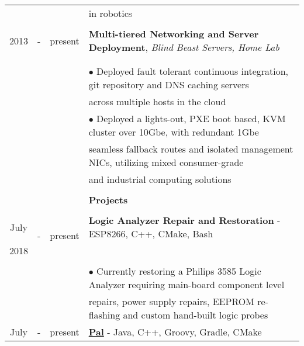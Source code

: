 \documentclass[10pt]{article}
\begin{document}
\begin{table}[ht]
\begin{tabular}{@{\hspace{0mm}}c@{\hspace{1mm}}c@{\hspace{3mm}}cl}
            & & & \hspace*{3mm}in robotics\\
            \vspace*{-3mm}\\
            2013 & - & present & \textbf{Multi-tiered Networking and Server Deployment}, 
            \textit{Blind Beast Servers, Home Lab}\\
            & & &\\
            \vspace*{-8mm}\\
            & & & $\bullet$ Deployed fault tolerant continuous integration, git repository and DNS caching servers\\
            & & & \hspace*{3mm}across multiple hosts in the cloud\\
            & & & $\bullet$ Deployed a lights-out, PXE boot based, KVM cluster over 10Gbe, with redundant 1Gbe\\
            & & & \hspace*{3mm}seamless fallback routes and isolated management NICs, utilizing mixed consumer-grade\\
            & & & \hspace*{3mm}and industrial computing solutions\\
            & & & \color{maroon}{\rule{14cm}{0.75pt}}\\
            & & & \large{\textbf{Projects}}\\[-2mm]
            & & & \color{maroon}{\rule{14cm}{0.75pt}}\\
            July & \multirow{2}{*}{-} & \multirow{2}{*}{present} & \textbf{Logic Analyzer Repair and Restoration} - ESP8266, C++, CMake, Bash\\
            2018 & & &\\
            \vspace*{-8.5mm}\\
            & & & $\bullet$ Currently restoring a Philips 3585 Logic Analyzer requiring main-board component level\\
            & & & \hspace*{3mm}repairs, power supply repairs, EEPROM re-flashing and custom hand-built logic probes\\
            July & \multirow{2}{*}{-} & \multirow{2}{*}{present} & \textbf{\href{https://github.com/Matthewacon/Pal}{Pal}} - Java, C++, Groovy, Gradle, CMake\\

\end{tabular}
\end{table}
\end{document}
